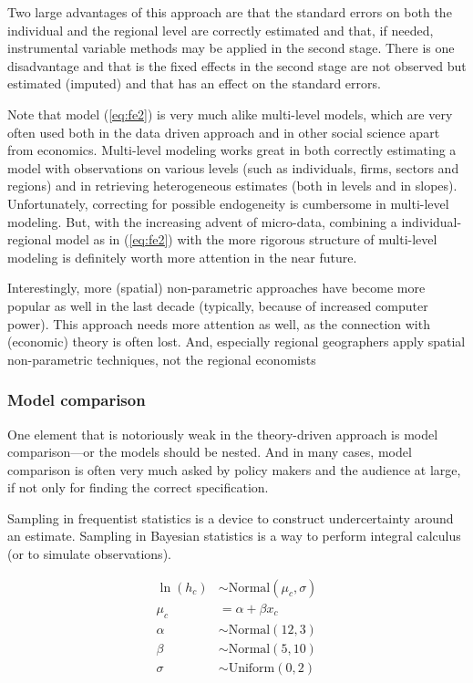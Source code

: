 \documentclass[fleqn,10pt]{SelfArx} %
\begin{document}
Two large advantages of this approach are that the standard errors on both the
individual and the regional level are correctly estimated and that, if needed,
instrumental variable methods may be applied in the second stage. There is one
disadvantage and that is the fixed effects in the second stage are not observed
but estimated (imputed) and that has an effect on the standard errors.

Note that model (\ref{eq:fe2}) is very much alike multi-level models, which are
very often used both in the data driven approach and in other social science
apart from economics. Multi-level modeling works great in both correctly
estimating a model with observations on various levels (such as individuals, firms,
sectors and regions) and in retrieving heterogeneous estimates (both in levels
and in slopes). Unfortunately, correcting for possible endogeneity is cumbersome
in multi-level modeling. But, with the increasing advent of micro-data,
combining a individual-regional model as in (\ref{eq:fe2}) with the more
rigorous structure of multi-level modeling is definitely worth more attention in
the near future. 

Interestingly, more (spatial) non-parametric approaches \citep[see, e.g., the
geograpically weighted regression exercise in]{Thissen2016} have become more
popular as well in the last decade (typically, because of increased computer
power). This approach needs more attention as well, as the connection with
(economic) theory is often lost. And, especially regional geographers apply
spatial non-parametric techniques, not the regional economists 

\subsubsection{Model comparison}

One element that is notoriously weak in the theory-driven approach is model
comparison---or the models should be nested. And in many cases, model comparison
is often very much asked by policy makers and the audience at large, if not only
for finding the correct specification. 

Sampling in frequentist statistics is a device to construct undercertainty
around an estimate. Sampling in Bayesian statistics is a way to perform integral
calculus (or to simulate observations). 

\begin{align}
  \ln(h_c) & \sim \text{Normal}(\mu_c, \sigma) \tag{likelihood}\\
  \mu_c & = \alpha + \beta x_c \tag{linear model}\\
  \alpha & \sim \text{Normal}(12,3) \tag{$\alpha$ prior}\\
  \beta & \sim \text{Normal}(5,10) \tag{$\beta$ prior}\\
  \sigma &\sim \text{Uniform}(0,2) \tag{$\sigma$ prior}
  \label{eq:bayes}         
\end{align}
\end{document}
